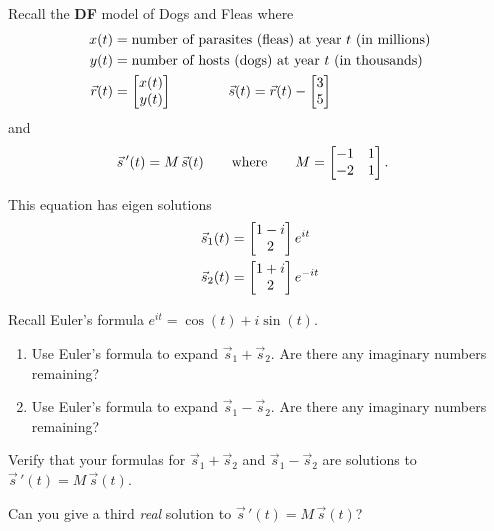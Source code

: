 \documentclass{workbook}
\begin{document}
\begin{slide}
	\question
 		Recall the \textbf{DF} model of Dogs and Fleas where 
	\begin{align*}
		x(t) &= \text{number of parasites (fleas) at year $t$ (in millions)}\\
		y(t) &= \text{number of hosts (dogs) at year $t$ (in thousands)}\\
		\vec r(t) &= \mat{x(t)\\y(t)} \qquad\qquad
		\vec s(t) = \vec r(t) - \mat{3\\5}
	\end{align*}
	and
	\begin{align*}
		\vec s\,'(t) &= M\,\vec s(t)\qquad\text{where}\qquad M=\mat{-1&1\\-2&1}.
	\end{align*}
	
	This equation has eigen solutions
	\begin{align*}
		\vec s_1(t) &= \begin{bmatrix}1-i\\2\end{bmatrix}e^{it}\\
		\vec s_2(t) &= \begin{bmatrix}1+i\\2\end{bmatrix}e^{-it}
	\end{align*}
	
	\begin{parts}
		\item Recall Euler's formula $e^{it}=\cos(t)+i\sin(t)$. 
		\begin{enumerate}
			\item Use Euler's formula to expand $\vec s_1 + \vec s_2$. Are there any imaginary numbers remaining?
			\item Use Euler's formula to expand $\vec s_1 - \vec s_2$. Are there any imaginary numbers remaining?
		\end{enumerate}
		\item Verify that your formulas for $\vec s_1+\vec s_2$ and $\vec s_1-\vec s_2$ are solutions to
			$\vec s\,'(t) = M\,\vec s(t)$.
		\item Can you give a third \emph{real} solution to $\vec s\,'(t) = M\,\vec s(t)$?
	\end{parts}
\end{slide}
\end{document}
